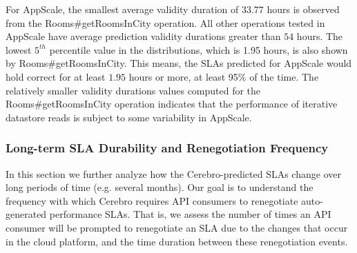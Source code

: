 For AppScale, 
the smallest average validity duration of $33.77$ hours is observed from the
Rooms\#getRoomsInCity operation. All other operations tested in 
AppScale have average prediction validity durations greater
than $54$ hours. The lowest $5^{th}$ percentile value in the 
distributions, which is 1.95 hours, is 
also shown by Rooms\#getRoomsInCity. This means, the SLAs predicted for
AppScale would hold correct for at least $1.95$ hours or more, 
at least 95\% of the time.
The relatively smaller validity durations values computed for the
Rooms\#getRoomsInCity operation indicates that the performance of 
iterative datastore reads is subject to some variability 
in AppScale.

%

\subsubsection{Long-term SLA Durability and Renegotiation Frequency}
In this section we further analyze how the Cerebro-predicted SLAs change over 
long periods of time (e.g. several months). Our goal is to understand the frequency with
which Cerebro requires API consumers to renegotiate auto-generated performance SLAs. That is,
we assess the number of times an API consumer will be prompted to renegotiate an
SLA due to the changes that occur in the cloud platform, and the time duration
between these renegotiation events.

